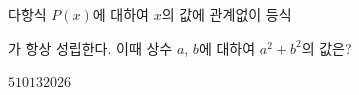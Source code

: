 다항식 $P(x)$에 대하여 $x$의 값에 관계없이 등식\par\smallskip{}\par\smallskip\noindent 가 항상 성립한다. 이때 상수 $a$, $b$에 대하여 $a^2+b^2$의 값은?
\begin{choices32}{$5$}{$10$}{$13$}{$20$}{$26$}\end{choices32}
